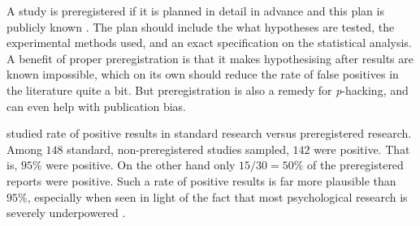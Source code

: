 A study is preregistered if it is planned in detail in advance and this plan is publicly known \parencite{Van_t_Veer2016-fo}. The plan should include the what hypotheses are tested, the experimental methods used, and an exact specification on the statistical analysis. A benefit of proper preregistration is that it makes hypothesising after results are known impossible, which on its own should reduce the rate of false positives in the literature quite a bit. But preregistration is also a remedy for \emph{p}-hacking, and can even help with publication bias.

\textcite{Scheel2020-sq} studied rate of positive results in standard research versus preregistered research. Among $148$ standard, non-preregistered studies sampled, $142$ were positive. That is, $95\%$ were positive. On the other hand only $15/30=50\%$ of the preregistered reports were positive. Such a rate of positive results is far more plausible than $95\%$, especially when seen in light of the fact that most psychological research is severely underpowered \parencite{Sedlmeier1989-zz}.



